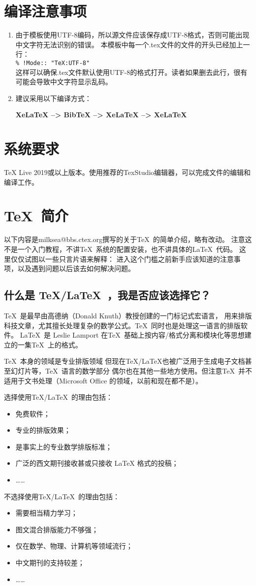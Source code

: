 \section{编译注意事项}
\begin{enumerate}
	\item 由于模板使用UTF-8编码，所以源文件应该保存成UTF-8格式，否则可能出现中文字符无法识别的错误。
	      本模板中每一个.tex文件的文件的开头已经加上一行：\\
	      \verb|% !Mode:: "TeX:UTF-8"|\\
	      这样可以确保.tex文件默认使用UTF-8的格式打开。读者如果删去此行，很有可能会导致中文字符显示乱码。
	\item 建议采用以下编译方式：

	{\color{red}\heiti\bfseries XeLaTeX --> BibTeX --> XeLaTeX --> XeLaTeX}
\end{enumerate}
\section{系统要求}
TeX Live 2019或以上版本。使用推荐的TexStudio编辑器，可以完成文件的编辑和编译工作。
\section{\TeX~简介}
以下内容是milksea@bbs.ctex.org撰写的关于\TeX~的简单介绍，略有改动。
注意这不是一个入门教程，不讲\TeX~系统的配置安装，也不讲具体的\LaTeX~代码。
这里仅仅试图以一些只言片语来解释：
进入这个门槛之前新手应该知道的注意事项，以及遇到问题以后该去如何解决问题。
\subsection{什么是 \TeX/\LaTeX~，我是否应该选择它？}
\TeX~是最早由高德纳（Donald Knuth）教授创建的一门标记式宏语言，
用来排版科技文章，尤其擅长处理复杂的数学公式。\TeX~同时也是处理这一语言的排版软件。
\LaTeX~是 Leslie Lamport 在\TeX~基础上按内容/格式分离和模块化等思想建立的一集\TeX~上的格式。

\TeX~本身的领域是专业排版领域
但现在TeX/LaTeX也被广泛用于生成电子文档甚至幻灯片等，\TeX~语言的数学部分
偶尔也在其他一些地方使用。但注意\TeX~并不适用于文书处理（Microsoft Office 的领域，以前和现在都不是）。

选择使用\TeX/\LaTeX~的理由包括：
\begin{itemize}
	\item 免费软件；
	\item 专业的排版效果；
	\item 是事实上的专业数学排版标准；
	\item 广泛的西文期刊接收甚或只接收 LaTeX 格式的投稿；
	\item[] ……
\end{itemize}
不选择使用\TeX/\LaTeX~的理由包括：
\begin{itemize}
	\item 需要相当精力学习；
	\item 图文混合排版能力不够强；
	\item 仅在数学、物理、计算机等领域流行；
	\item 中文期刊的支持较差；
	\item[] ……
\end{itemize}

